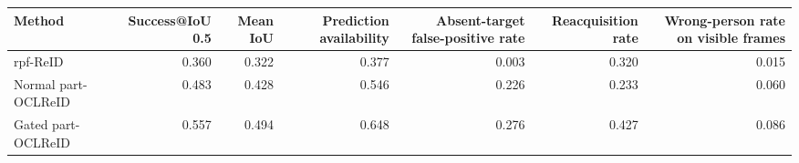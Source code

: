 \begin{tabular}{lrrrrrr}
\toprule
             Method &  Success@IoU 0.5 &  Mean IoU &  Prediction availability &  Absent-target false-positive rate &  Reacquisition rate &  Wrong-person rate on visible frames \\
\midrule
           rpf-ReID &            0.360 &     0.322 &                    0.377 &                              0.003 &               0.320 &                                0.015 \\
Normal part-OCLReID &            0.483 &     0.428 &                    0.546 &                              0.226 &               0.233 &                                0.060 \\
 Gated part-OCLReID &            0.557 &     0.494 &                    0.648 &                              0.276 &               0.427 &                                0.086 \\
\bottomrule
\end{tabular}

